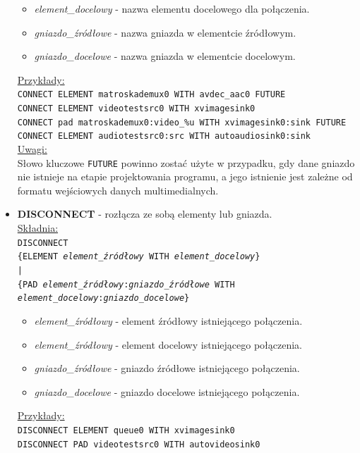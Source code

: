 \documentclass[12pt]{article}
\begin{document}
\begin{itemize}
\begin{itemize}
\item \textit{element\_docelowy} - nazwa elementu docelowego dla połączenia.
\item \textit{gniazdo\_źródłowe} - nazwa gniazda w elementcie źródłowym.
\item \textit{gniazdo\_docelowe} - nazwa gniazda w elementcie docelowym.
\end{itemize}
\underline{Przykłady:} \\
\texttt{CONNECT ELEMENT matroskademux0 WITH avdec\_aac0 FUTURE} \\
\texttt{CONNECT ELEMENT videotestsrc0 WITH xvimagesink0} \\
\texttt{CONNECT pad matroskademux0:video\_\%u WITH xvimagesink0:sink FUTURE}
\texttt{CONNECT ELEMENT audiotestsrc0:src WITH autoaudiosink0:sink} \\
\underline{Uwagi:} \\
Słowo kluczowe \texttt{FUTURE} powinno zostać użyte w przypadku, gdy dane gniazdo nie istnieje na etapie projektowania programu, a jego istnienie jest zależne od formatu wejściowych danych multimedialnych.
\item \textbf{DISCONNECT} - rozłącza ze sobą elementy lub gniazda. \\
\underline{Składnia:} \\
\texttt{DISCONNECT \\
\hspace*{2em} \{ELEMENT \textit{element\_źródłowy} WITH \textit{element\_docelowy}\} \\
\hspace*{2em} | \\
\hspace*{2em} \{PAD \textit{element\_źródłowy}:\textit{gniazdo\_źródłowe} WITH \\
\hspace*{4em} \textit{element\_docelowy}:\textit{gniazdo\_docelowe}\}
}
\begin{itemize}
 \setlength{\itemsep}{0em}
\item \textit{element\_źródłowy} - element źródłowy istniejącego połączenia.
\item \textit{element\_źródłowy} - element docelowy istniejącego połączenia.
\item \textit{gniazdo\_źródłowe} - gniazdo źródłowe istniejącego połączenia.
\item \textit{gniazdo\_docelowe} - gniazdo docelowe istniejącego połączenia.
\end{itemize}
\underline{Przykłady:} \\
\texttt{DISCONNECT ELEMENT queue0 WITH xvimagesink0} \\
\texttt{DISCONNECT PAD videotestsrc0 WITH autovideosink0}
\end{itemize}\paragraph{}\vspace{-3mm}
\end{document}
